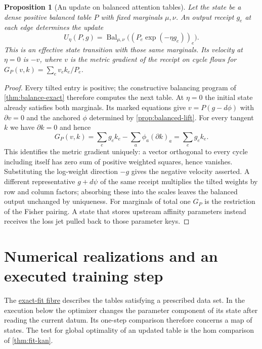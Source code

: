 \documentclass[11pt,a4paper]{article}
\newtheorem{proposition}[proposition]{Proposition}
\theoremstyle{definition}
\theoremstyle{remark}\newaliascnt{remark}{theorem}
\numberwithin{equation}{section}
\begin{document}
\begin{proposition}[An update on balanced attention tables]\label{prop:balanced-step}
Let the state be a dense positive balanced table $P$ with fixed marginals $\mu,\nu$. An output receipt $g_e$ at each edge determines the update
\[
 U_\eta(P,g)=\operatorname{Bal}_{\mu,\nu}\big((P_e\exp(-\eta g_e))_e\big).
\]
This is an effective state transition with those same marginals. Its velocity at $\eta=0$ is $-v$, where $v$ is the metric gradient of the receipt on cycle flows for
$G_P(v,k)=\sum_e v_e k_e/P_e$.
\end{proposition}
\begin{proof}
Every tilted entry is positive; the constructive balancing program of \cref{thm:balance-exact} therefore computes the next table. At $\eta=0$ the initial state already satisfies both marginals. Its marked equations give $v=P(g-d\phi)$ with $\partial v=0$ and the anchored $\phi$ determined by \cref{prop:balanced-lift}. For every tangent $k$ we have $\partial k=0$ and hence
\[
    G_P(v,k)=\sum_e g_e k_e-\sum_a\phi_a(\partial k)_a=\sum_e g_e k_e .
\]
This identifies the metric gradient uniquely: a vector orthogonal to every cycle including itself has zero sum of positive weighted squares, hence vanishes. Substituting the log-weight direction $-g$ gives the negative velocity asserted. A different representative $g+d\psi$ of the same receipt multiplies the tilted weights by row and column factors; absorbing these into the scales leaves the balanced output unchanged by uniqueness. For marginals of total one $G_P$ is the restriction of the Fisher pairing. A state that stores upstream affinity parameters instead receives the loss jet pulled back to those parameter keys.
\end{proof}

\section{Numerical realizations and an executed training step}\label{sec:realizations}

The \hyperref[sec:fit-fibre]{exact-fit fibre} describes the tables satisfying a prescribed data set. In the execution below the optimizer changes the parameter component of its state after reading the current datum. Its one-step comparison therefore concerns a map of states. The test for global optimality of an updated table is the hom comparison of \cref{thm:fit-kan}.
\end{document}
